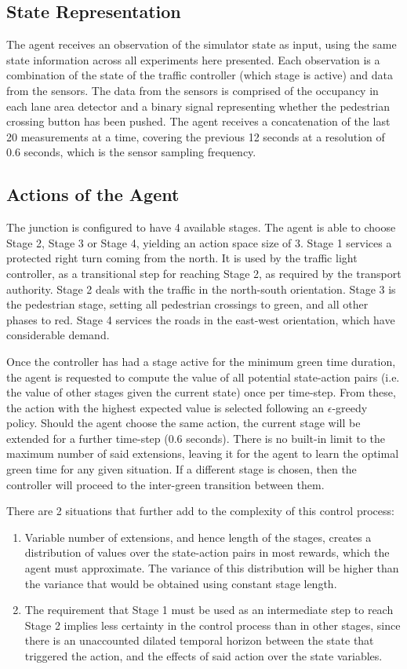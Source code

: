 \documentclass[a4paper, conference]{IEEEtran}
\begin{document}
\subsection{State Representation}
The agent receives an observation of the simulator state as input, using the same state information across all experiments here presented.
Each observation is a combination of the state of the traffic controller (which stage is active) and data from the sensors.
The data from the sensors is comprised of the occupancy in each lane area detector and a binary signal representing whether the pedestrian crossing button has been pushed.
The agent receives a concatenation of the last 20 measurements at a time, covering the previous 12 seconds at a resolution of 0.6 seconds, which is the sensor sampling frequency.

\subsection{Actions of the Agent}
The junction is configured to have 4 available stages. 
The agent is able to choose Stage 2, Stage 3 or Stage 4, yielding an action space size of 3.
Stage 1 services a protected right turn coming from the north. It is used by the traffic light controller, as a transitional step for reaching Stage 2, as required by the transport authority.
Stage 2 deals with the traffic in the north-south orientation.
Stage 3 is the pedestrian stage, setting all pedestrian crossings to green, and all other phases to red.
Stage 4 services the roads in the east-west orientation, which have considerable demand.

Once the controller has had a stage active for the minimum green time duration, the agent is requested to compute the value of all potential state-action pairs (i.e. the value of other stages given the current state) once per time-step.
From these, the action with the highest expected value is selected following an $\epsilon$-greedy policy\cite{suttonbarto}.
Should the agent choose the same action, the current stage will be extended for a further time-step (0.6 seconds).
There is no built-in limit to the maximum number of said extensions, leaving it for the agent to learn the optimal green time for any given situation.
If a different stage is chosen, then the controller will proceed to the inter-green transition between them.

There are 2 situations that further add to the complexity of this control process:
\begin{enumerate}
\item Variable number of extensions, and hence length of the stages, creates a distribution of values over the state-action pairs in most rewards, which the agent must approximate. The variance of this distribution will be higher than the variance that would be obtained using constant stage length.
\item The requirement that Stage 1 must be used as an intermediate step to reach Stage 2 implies less certainty in the control process than in other stages, since there is an unaccounted dilated temporal horizon between the state that triggered the action, and the effects of said action over the state variables.
\end{enumerate}
\end{document}
